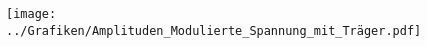 
\FloatBarrier\begin{figure}[!h]
\centering
\texttt{[image: ../Grafiken/Amplituden\_Modulierte\_Spannung\_mit\_Träger.pdf]}
\caption{\label{fig:amplituden_modulierte_spannung_mit_träger}}
\end{figure}
\FloatBarrier